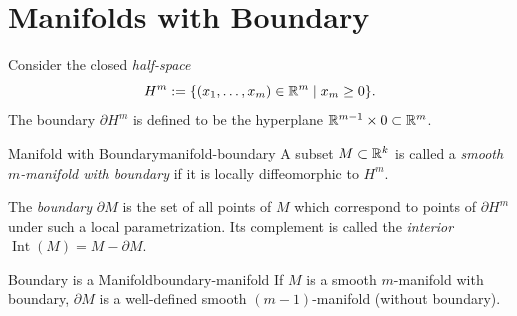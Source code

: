 
\section{Manifolds with Boundary}

Consider the closed \emph{half-space}
\[
    H^m := \{(x_1, \ldots, x_m) \in \mathbb{R}^m \mid x_m \geq 0\}.
\]
The boundary $\partial H^m$ is defined to be the hyperplane $\mathbb{R}^{m-1} \times 0 \subset \mathbb{R}^m$.

\begin{definition}{Manifold with Boundary}{manifold-boundary}
    A subset $M \subset \mathbb{R}^k$ is called a \emph{smooth $m$-manifold with boundary} if it is locally diffeomorphic to $H^m$.
\end{definition}

The \emph{boundary} $\partial M$ is the set of all points of $M$ which correspond to points of $\partial H^m$ under such a local parametrization. Its complement is called the \emph{interior} $\operatorname{Int}(M) = M - \partial M$.

\begin{center}
\end{center}

\begin{proposition}{Boundary is a Manifold}{boundary-manifold}
    If $M$ is a smooth $m$-manifold with boundary, $\partial M$ is a well-defined smooth $(m-1)$-manifold (without boundary).
\end{proposition}

